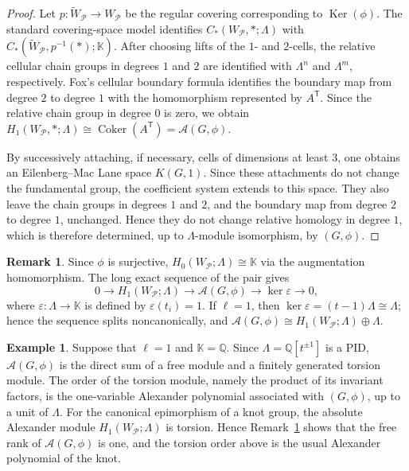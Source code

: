 \documentclass{article}
\theoremstyle{definition}
\newtheorem{remark}[definition]{Remark}
\newtheorem{example}[definition]{Example}
\theoremstyle{plain}
\def\Ker{\mathop{\mathrm{Ker}}\nolimits}
\def\Coker{\mathop{\mathrm{Coker}}\nolimits}
\newcommand{\Q}{{\mathbb{Q}}}
\newcommand{\K}{\mathbb{K}}
\begin{document}
\begin{proof}
Let \(p\colon\widetilde W_{\mathcal{P}}\to W_{\mathcal{P}}\) be the regular covering corresponding
to \(\Ker(\phi)\). The standard covering-space model identifies
\(C_*(W_{\mathcal{P}},*;\Lambda)\) with
\(C_*(\widetilde W_{\mathcal{P}},p^{-1}(*);\K)\). After choosing lifts of the
\(1\)- and \(2\)-cells, the relative cellular chain groups in degrees
\(1\) and \(2\) are identified with \(\Lambda^n\) and \(\Lambda^m\),
respectively. Fox's cellular boundary formula identifies the boundary map
from degree \(2\) to degree \(1\) with the homomorphism represented by
\(A^{\mathsf T}\). Since the relative chain group in degree \(0\) is zero,
we obtain
\(H_1(W_{\mathcal{P}},*;\Lambda)\cong\Coker(A^{\mathsf T})=\mathcal A(G,\phi)\).

By successively attaching, if necessary, cells of dimensions at least
\(3\), one obtains an Eilenberg--Mac Lane space \(K(G,1)\). Since these
attachments do not change the fundamental group, the coefficient system
extends to this space. They also leave the chain groups in degrees \(1\)
and \(2\), and the boundary map from degree \(2\) to degree \(1\),
unchanged. Hence they do not change relative homology in degree \(1\),
which is therefore determined, up to \(\Lambda\)-module isomorphism, by
\((G,\phi)\).
\end{proof}

\begin{remark}\label{rem:absolute-relative}
Since \(\phi\) is surjective, \(H_0(W_{\mathcal{P}};\Lambda)\cong\K\) via the
augmentation homomorphism. The long exact sequence of the pair gives
\[
0\longrightarrow H_1(W_{\mathcal{P}};\Lambda)
 \longrightarrow \mathcal A(G,\phi)
 \longrightarrow \ker\varepsilon
 \longrightarrow 0,
\]
where \(\varepsilon\colon\Lambda\to\K\) is defined by
\(\varepsilon(t_i)=1\). If \(\ell=1\), then
\(\ker\varepsilon=(t-1)\Lambda\cong\Lambda\); hence the sequence splits
noncanonically, and
\(\mathcal A(G,\phi)\cong H_1(W_{\mathcal{P}};\Lambda)\oplus\Lambda\).
\end{remark}

\begin{example}\label{ex:l1}
Suppose that \(\ell=1\) and \(\K=\Q\). Since
\(\Lambda=\Q[t^{\pm1}]\) is a PID, \(\mathcal A(G,\phi)\) is the direct
sum of a free module and a finitely generated torsion module. The order of
the torsion module, namely the product of its invariant factors, is the
one-variable Alexander polynomial associated with \((G,\phi)\), up to a
unit of \(\Lambda\). For the canonical epimorphism of a knot group, the
absolute Alexander module \(H_1(W_{\mathcal{P}};\Lambda)\) is torsion. Hence
Remark~\ref{rem:absolute-relative} shows that the free rank of
\(\mathcal A(G,\phi)\) is one, and the torsion order above is the usual
Alexander polynomial of the knot.
\end{example}
\end{document}
